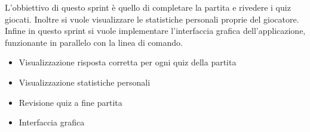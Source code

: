 L'obbiettivo di questo sprint è quello di completare la partita e rivedere i quiz giocati. Inoltre si vuole visualizzare le statistiche personali proprie del giocatore. 
Infine in questo sprint si vuole implementare l'interfaccia grafica dell'applicazione, funzionante in parallelo con la linea di comando.
\begin{itemize}
    \item Visualizzazione risposta corretta per ogni quiz della partita
    \item Visualizzazione statistiche personali
    \item Revisione quiz a fine partita
    \item Interfaccia grafica
\end{itemize} 